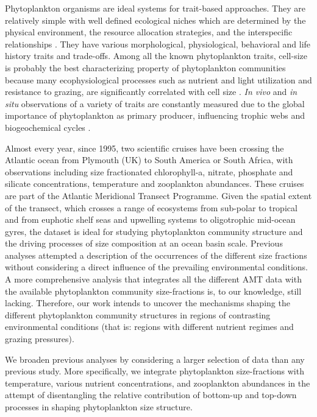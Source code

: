 Phytoplankton organisms are ideal systems for trait-based approaches. They are relatively simple with well defined ecological niches which are determined by the physical environment, the resource allocation strategies, and the interspecific relationships \citep{Litchman2007}. They have various morphological, physiological, behavioral and life history traits and trade-offs. Among all the known phytoplankton traits, cell-size is probably the best characterizing property of phytoplankton communities because many ecophysiological processes such as nutrient and light utilization and resistance to grazing, are significantly correlated with cell size \citep{Litchman2008,Litchman2010}. \textit{In vivo} and \textit{in situ} observations of a variety of traits are constantly measured due to the global importance of phytoplankton as primary producer, influencing trophic webs and biogeochemical cycles \citep{Falkowski1998}.

Almost every year, since 1995, two scientific cruises have been  crossing the Atlantic ocean from Plymouth (UK) to South America or South Africa, with observations including size fractionated chlorophyll-a, nitrate, phosphate and silicate concentrations, temperature and zooplankton abundances. These cruises are part of the Atlantic Meridional Transect Programme. Given the spatial extent of the transect, which crosses a range of ecosystems from sub-polar to tropical and from euphotic shelf seas and upwelling systems to oligotrophic mid-ocean gyres, the dataset is ideal for studying phytoplankton community structure and the driving processes of size composition at an ocean basin scale. Previous analyses attempted a description of the occurrences of the different size fractions \citep{Maranon2001} without considering a direct influence of the prevailing environmental conditions. A more comprehensive analysis that integrates all the different AMT data with the available phytoplankton community size-fractions is, to our knowledge, still lacking. Therefore, our work intends to uncover the mechanisms shaping the different phytoplankton community structures in regions of contrasting environmental conditions (that is: regions with different nutrient regimes and grazing pressures).

We broaden previous analyses by considering a larger selection of data than any previous study. More specifically, we integrate phytoplankton size-fractions with temperature, various nutrient concentrations, and zooplankton abundances in the attempt of disentangling the relative contribution of bottom-up and top-down processes in shaping phytoplankton size structure.

